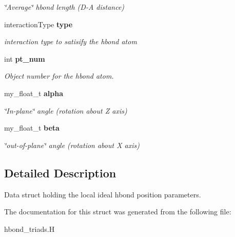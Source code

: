 \begin{CompactItemize}
\begin{CompactList}\small\item\em \char`\"{}Average\char`\"{} hbond length (D-A distance) \item\end{CompactList}\item 
interaction\-Type \bf{type}\label{structSimSite3D_1_1hbond__triad__t_9211af10c6925f80ac7e6a1cb01f92a6}

\begin{CompactList}\small\item\em interaction type to satisify the hbond atom \item\end{CompactList}\item 
int \bf{pt\_\-num}\label{structSimSite3D_1_1hbond__triad__t_19531534552566a3002c718ccfeef088}

\begin{CompactList}\small\item\em Object number for the hbond atom. \item\end{CompactList}\item 
my\_\-float\_\-t \bf{alpha}\label{structSimSite3D_1_1hbond__triad__t_b80b511a9b9ed06e7f4ad429e4741aa2}

\begin{CompactList}\small\item\em \char`\"{}In-plane\char`\"{} angle (rotation about Z axis) \item\end{CompactList}\item 
my\_\-float\_\-t \bf{beta}\label{structSimSite3D_1_1hbond__triad__t_1eb0d83d4bce81817260cc3cb7d843d5}

\begin{CompactList}\small\item\em \char`\"{}out-of-plane\char`\"{} angle (rotation about X axis) \item\end{CompactList}\end{CompactItemize}


\subsection{Detailed Description}
Data struct holding the local ideal hbond position parameters. 



The documentation for this struct was generated from the following file:\begin{CompactItemize}
\item 
hbond\_\-triads.H\end{CompactItemize}
